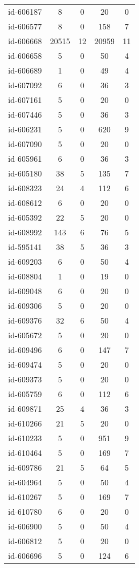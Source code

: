 \begin{tabular}{ccccc}
id-606187 & 8 & 0 & 20 & 0\\
id-606577 & 8 & 0 & 158 & 7\\
id-606668 & 20515 & 12 & 20959 & 11\\
id-606658 & 5 & 0 & 50 & 4\\
id-606689 & 1 & 0 & 49 & 4\\
id-607092 & 6 & 0 & 36 & 3\\
id-607161 & 5 & 0 & 20 & 0\\
id-607446 & 5 & 0 & 36 & 3\\
id-606231 & 5 & 0 & 620 & 9\\
id-607090 & 5 & 0 & 20 & 0\\
id-605961 & 6 & 0 & 36 & 3\\
id-605180 & 38 & 5 & 135 & 7\\
id-608323 & 24 & 4 & 112 & 6\\
id-608612 & 6 & 0 & 20 & 0\\
id-605392 & 22 & 5 & 20 & 0\\
id-608992 & 143 & 6 & 76 & 5\\
id-595141 & 38 & 5 & 36 & 3\\
id-609203 & 6 & 0 & 50 & 4\\
id-608804 & 1 & 0 & 19 & 0\\
id-609048 & 6 & 0 & 20 & 0\\
id-609306 & 5 & 0 & 20 & 0\\
id-609376 & 32 & 6 & 50 & 4\\
id-605672 & 5 & 0 & 20 & 0\\
id-609496 & 6 & 0 & 147 & 7\\
id-609474 & 5 & 0 & 20 & 0\\
id-609373 & 5 & 0 & 20 & 0\\
id-605759 & 6 & 0 & 112 & 6\\
id-609871 & 25 & 4 & 36 & 3\\
id-610266 & 21 & 5 & 20 & 0\\
id-610233 & 5 & 0 & 951 & 9\\
id-610464 & 5 & 0 & 169 & 7\\
id-609786 & 21 & 5 & 64 & 5\\
id-604964 & 5 & 0 & 50 & 4\\
id-610267 & 5 & 0 & 169 & 7\\
id-610780 & 6 & 0 & 20 & 0\\
id-606900 & 5 & 0 & 50 & 4\\
id-606812 & 5 & 0 & 20 & 0\\
id-606696 & 5 & 0 & 124 & 6\\

\end{tabular}

